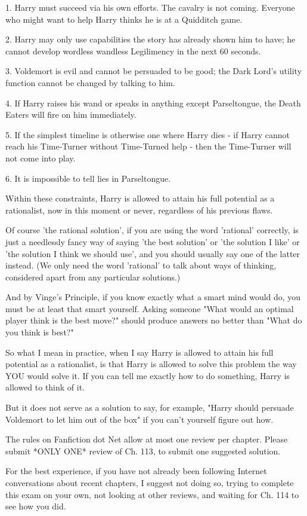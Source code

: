 1. Harry must succeed via his own efforts. The cavalry is not coming.
Everyone who might want to help Harry thinks he is at a Quidditch game.

2. Harry may only use capabilities the story has already shown him to have;
he cannot develop wordless wandless Legilimency in the next 60 seconds.

3. Voldemort is evil and cannot be persuaded to be good;
the Dark Lord's utility function cannot be changed by talking to him.

4. If Harry raises his wand or speaks in anything except Parseltongue,
the Death Eaters will fire on him immediately.

5. If the simplest timeline is otherwise one where Harry dies -
if Harry cannot reach his Time-Turner without Time-Turned help -
then the Time-Turner will not come into play.

6. It is impossible to tell lies in Parseltongue.

Within these constraints,
Harry is allowed to attain his full potential as a rationalist,
now in this moment or never,
regardless of his previous flaws.

Of course 'the rational solution',
if you are using the word 'rational' correctly,
is just a needlessly fancy way of saying 'the best solution'
or 'the solution I like' or 'the solution I think we should use',
and you should usually say one of the latter instead.
(We only need the word 'rational' to talk about ways of thinking,
considered apart from any particular solutions.)

And by Vinge's Principle,
if you know exactly what a smart mind would do,
you must be at least that smart yourself.
Asking someone "What would an optimal player think is the best move?"
should produce answers no better than "What do you think is best?"

So what I mean in practice,
when I say Harry is allowed to attain his full potential as a rationalist,
is that Harry is allowed to solve this problem
the way YOU would solve it.
If you can tell me exactly how to do something,
Harry is allowed to think of it.

But it does not serve as a solution to say, for example,
"Harry should persuade Voldemort to let him out of the box"
if you can't yourself figure out how.

The rules on Fanfiction dot Net allow at most one review per chapter.
Please submit *ONLY ONE* review of Ch. 113,
to submit one suggested solution.

For the best experience, if you have not already been following
Internet conversations about recent chapters, I suggest not doing so,
trying to complete this exam on your own,
not looking at other reviews,
and waiting for Ch. 114 to see how you did.

